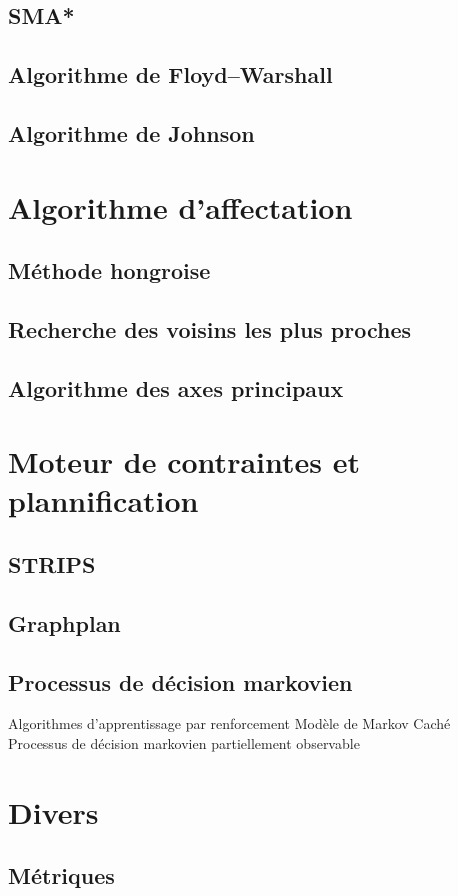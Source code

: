 \subsection{SMA*}
\subsection{Algorithme de Floyd–Warshall}
\subsection{Algorithme de Johnson}

%
\section{Algorithme d'affectation}
\subsection{Méthode hongroise}
\subsection{Recherche des voisins les plus proches}
\subsection{Algorithme des axes principaux}

\section{Moteur de contraintes et plannification}
\subsection{STRIPS}
\subsection{Graphplan}
\subsection{Processus de décision markovien}
Algorithmes d'apprentissage par renforcement
Modèle de Markov Caché
Processus de décision markovien partiellement observable

\section{Divers}
\subsection{Métriques}
